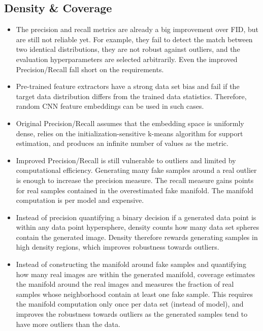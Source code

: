 \documentclass{article}
\begin{document}
\subsection{Density \& Coverage}
\begin{itemize}
    \item The precision and recall metrics are already a big improvement over FID, but are still not reliable yet. For example, they fail to detect the match between two identical distributions, they are not robust against outliers, and the evaluation hyperparameters are selected arbitrarily. Even the improved Precision/Recall fall short on the requirements. 
    \item Pre-trained feature extractors have a strong data set bias and fail if the target data distribution differs from the trained data statistics. Therefore, random CNN feature embeddings can be used in such cases.
    \item Original Precision/Recall assumes that the embedding space is uniformly dense, relies on the initialization-sensitive k-means algorithm for support estimation, and produces an infinite number of values as the metric.
    \item Improved Precision/Recall is still vulnerable to outliers and limited by computational efficiency. Generating many fake samples around a real outlier is enough to increase the precision measure. The recall measure gains points for real samples contained in the overestimated fake manifold. The manifold computation is per model and expensive.
    \item Instead of precision quantifying a binary decision if a generated data point is within any data point hypersphere, density counts how many data set spheres contain the generated image. Density therefore rewards generating samples in high density regions, which improves robustness towards outliers.
    \item Instead of constructing the manifold around fake samples and quantifying how many real images are within the generated manifold, coverage estimates the manifold around the real images and measures the fraction of real samples whose neighborhood contain at least one fake sample. This requires the manifold computation only once per data set (instead of model), and improves the robustness towards outliers as the generated samples tend to have more outliers than the data.
\end{itemize}
\end{document}
